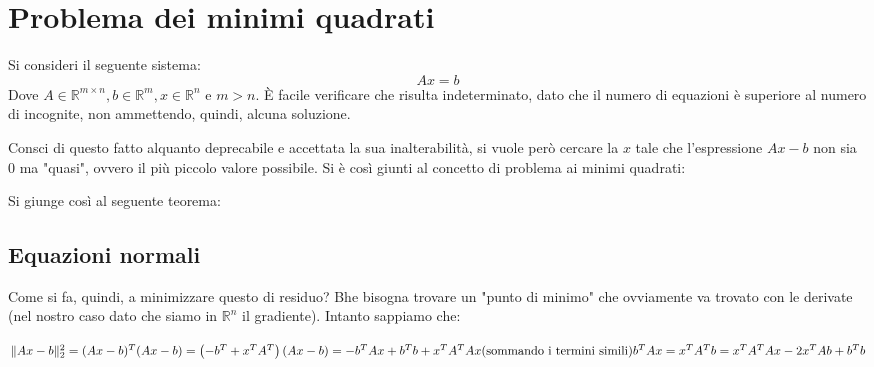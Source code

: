 \chapter{Problema dei minimi quadrati}
Si consideri il seguente sistema:
\[
    Ax = b    
\]
Dove $A\in \mathbb{R}^{m\times n},b\in \mathbb{R}^m, x\in \mathbb{R}^n$ e $m > n$. È facile verificare che risulta indeterminato, dato che il numero di equazioni è superiore al numero di incognite, non ammettendo, quindi, alcuna soluzione. 

Consci di questo fatto alquanto deprecabile e accettata la sua inalterabilità, si vuole però cercare la $x$ tale che l'espressione $Ax-b$ non sia $0$ ma "quasi", ovvero il più piccolo valore possibile. Si è così giunti al concetto di problema ai minimi quadrati:

Si giunge così al seguente teorema:

\section{Equazioni  normali}
Come si fa, quindi, a minimizzare questo di residuo? Bhe bisogna trovare un "punto di minimo" che ovviamente va trovato con le derivate (nel nostro caso dato che siamo in $\mathbb{R}^n$ il gradiente). Intanto sappiamo che:
\begin{center}
    \begin{math}
        \|Ax - b\|_2^2 = (Ax - b)^T (Ax - b) \\
        = \left( -b^T + x^T A^T \right) (Ax - b) \\
        = -b^T A x + b^T b + x^T A^T A x \\
        \text{(sommando i termini simili)} \\
        b^T A x = x^T A^T b \\
        = x^T A^T A x - 2 x^T A b + b^T b
    \end{math}
\end{center}

